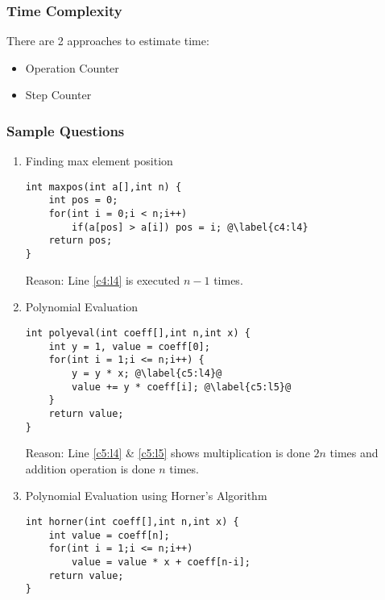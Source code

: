 \documentclass[./AlgorithmDesign.tex]{subfiles}
\begin{document}
\subsubsection{Time Complexity}

There are 2 approaches to estimate time:
\begin{itemize}
    \item Operation Counter
    \item Step Counter
\end{itemize}

\subsubsection*{Sample Questions}
\begin{enumerate}
\item Finding max element position
\begin{mdframed}
\begin{lstlisting}[label=c4]
int maxpos(int a[],int n) {
    int pos = 0;
    for(int i = 0;i < n;i++)
        if(a[pos] > a[i]) pos = i; @\label{c4:l4}
    return pos;
}
\end{lstlisting}

\vspace{3mm}

Reason: 
Line \ref{c4:l4} is executed $n-1$ times.
\end{mdframed}

\item Polynomial Evaluation
\begin{mdframed}
\begin{lstlisting}[label=c5]
int polyeval(int coeff[],int n,int x) {
    int y = 1, value = coeff[0];
    for(int i = 1;i <= n;i++) {
        y = y * x; @\label{c5:l4}@
        value += y * coeff[i]; @\label{c5:l5}@
    }
    return value;
}
\end{lstlisting}

\vspace{3mm}

Reason: 
Line \ref{c5:l4} \& \ref{c5:l5} shows multiplication is done $2n$ times and addition operation is done $n$ times.
\end{mdframed}

\item Polynomial Evaluation using Horner's Algorithm
\begin{mdframed}
\begin{lstlisting}[label=c6]
int horner(int coeff[],int n,int x) {
    int value = coeff[n];
    for(int i = 1;i <= n;i++) 
        value = value * x + coeff[n-i];
    return value;
}
\end{lstlisting}


\end{mdframed}
\end{enumerate}
\end{document}
